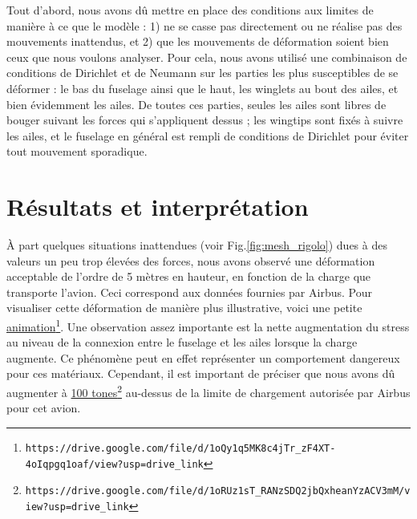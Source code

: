\documentclass{article}
\begin{document}
Tout d'abord, nous avons dû mettre en place des conditions aux limites de manière à ce que le modèle : 1) ne se casse pas directement ou ne réalise pas des mouvements inattendus, et 2) que les mouvements de déformation soient bien ceux que nous voulons analyser. Pour cela, nous avons utilisé une combinaison de conditions de Dirichlet et de Neumann sur les parties les plus susceptibles de se déformer : le bas du fuselage ainsi que le haut, les winglets au bout des ailes, et bien évidemment les ailes. De toutes ces parties, seules les ailes sont libres de bouger suivant les forces qui s'appliquent dessus ; les wingtips sont fixés à suivre les ailes, et le fuselage en général est rempli de conditions de Dirichlet pour éviter tout mouvement sporadique.


\section{Résultats et interprétation}
À part quelques situations inattendues (voir Fig.\ref{fig:mesh_rigolo}) dues à des valeurs un peu trop élevées des forces, nous avons observé une déformation acceptable de l'ordre de 5 mètres en hauteur, en fonction de la charge que transporte l'avion. Ceci correspond aux données fournies par Airbus. Pour visualiser cette déformation de manière plus illustrative, voici une petite \href{https://drive.google.com/file/d/1oQy1q5MK8c4jTr_zF4XT-4oIqpgq1oaf/view?usp=drive_link}{animation}\footnote{\texttt{https://drive.google.com/file/d/1oQy1q5MK8c4jTr\_zF4XT-4oIqpgq1oaf/view?usp=drive\_link}}. Une observation assez importante est la nette augmentation du stress au niveau de la connexion entre le fuselage et les ailes lorsque la charge augmente. Ce phénomène peut en effet représenter un comportement dangereux pour ces matériaux. Cependant, il est important de préciser que nous avons dû augmenter à \href{https://drive.google.com/file/d/1oRUz1sT_RANzSDQ2jbQxheanYzACV3mM/view?usp=drive_link}{100 tones}\footnote{\texttt{https://drive.google.com/file/d/1oRUz1sT\_RANzSDQ2jbQxheanYzACV3mM/view?usp=drive\_link}} au-dessus de la limite de chargement autorisée par Airbus pour cet avion.
\end{document}
